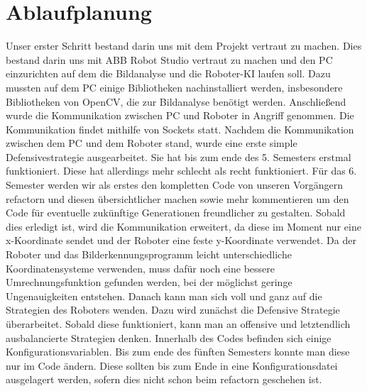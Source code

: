 \chapter{Ablaufplanung}
Unser erster Schritt bestand darin uns mit dem Projekt vertraut zu machen. Dies bestand darin uns mit ABB Robot Studio vertraut zu machen und den PC einzurichten auf dem die Bildanalyse und die Roboter-KI laufen soll. Dazu mussten auf dem PC einige Bibliotheken nachinstalliert werden, insbesondere Bibliotheken von OpenCV, die zur Bildanalyse benötigt werden. Anschließend wurde die Kommunikation zwischen PC und Roboter in Angriff genommen. Die Kommunikation findet mithilfe von Sockets statt. Nachdem die Kommunikation zwischen dem PC und dem Roboter stand, wurde eine erste simple Defensivestrategie ausgearbeitet. Sie hat bis zum ende des 5. Semesters erstmal funktioniert. Diese hat allerdings mehr schlecht als recht funktioniert. 
Für das 6. Semester werden wir als erstes den kompletten Code von unseren Vorgängern refactorn und diesen übersichtlicher machen sowie mehr kommentieren um den Code für eventuelle zukünftige Generationen freundlicher zu gestalten. Sobald dies erledigt ist, wird die Kommunikation erweitert, da diese im Moment nur eine x-Koordinate sendet und der Roboter eine feste y-Koordinate verwendet. Da der Roboter und das Bilderkennungsprogramm leicht unterschiedliche Koordinatensysteme verwenden, muss dafür noch eine bessere Umrechnungsfunktion gefunden werden, bei der möglichst geringe Ungenauigkeiten entstehen. Danach kann man sich voll und ganz auf die Strategien des Roboters wenden. Dazu wird zunächst die Defensive Strategie überarbeitet. Sobald diese funktioniert, kann man an offensive und letztendlich ausbalancierte Strategien denken. Innerhalb des Codes befinden sich einige Konfigurationsvariablen. Bis zum ende des fünften Semesters konnte man diese nur im Code ändern. Diese sollten bis zum Ende in eine Konfigurationsdatei ausgelagert werden, sofern dies nicht schon beim refactorn geschehen ist.

